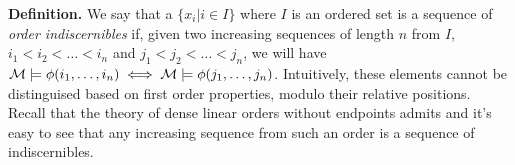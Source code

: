 \textbf{Definition.} We say that a \(\{x_i | i \in I\}\) where \(I\) is an ordered set is a sequence of \textit{order indiscernibles} if, given two increasing sequences of length \(n\) from \(I\), 
\(i_1 < i_2 < \ldots < i_n\) and \(j_1 < j_2 < \ldots < j_n\), we will have \(\mathcal{M} \models \phi(i_1, \ldots, i_n) \iff \mathcal{M} \models \phi(j_1, \ldots, j_n)\). 
Intuitively, these elements cannot be distinguised based on first order properties, modulo their relative positions.  
Recall that the theory of dense linear orders without endpoints admits \qe and it's easy to see that any increasing sequence from such an order is a sequence of indiscernibles. 

